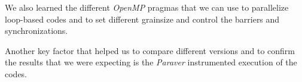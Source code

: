 \documentclass{article}
\begin{document}
\justify
We also learned the different \textit{OpenMP} pragmas that we can use to parallelize loop-based codes and to set different grainsize and control the barriers and synchronizations.

\justify
Another key factor that helped us to compare different versions and to confirm the results that we were expecting is the \textit{Paraver} instrumented execution of the codes. 
\end{document}
